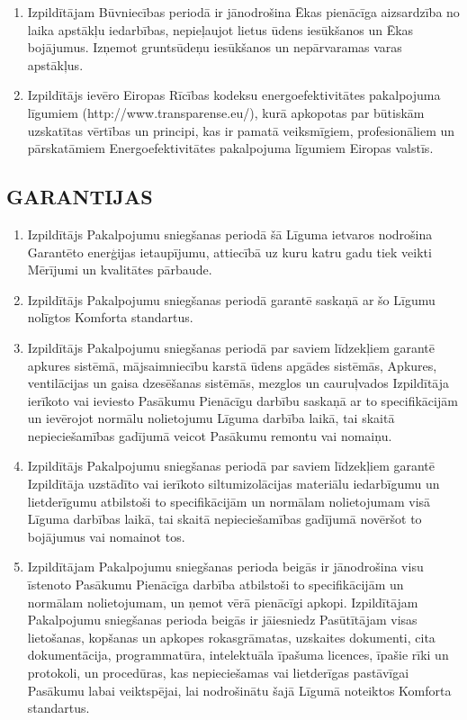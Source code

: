 \begin{multicols}{2}
\begin{enumerate}
	\item Izpildītājam Būvniecības periodā ir jānodrošina Ēkas pienācīga aizsardzība no laika apstākļu iedarbības, nepieļaujot lietus ūdens iesūkšanos un Ēkas bojājumus. Izņemot gruntsūdeņu iesūkšanos un nepārvaramas varas apstākļus.
	\item Izpildītājs ievēro Eiropas Rīcības kodeksu energoefektivitātes pakalpojuma līgumiem (http://www.transparense.eu/), kurā apkopotas par būtiskām uzskatītas vērtības un principi, kas ir pamatā veiksmīgiem, profesionāliem un pārskatāmiem Energoefektivitātes pakalpojuma līgumiem Eiropas valstīs.
\end{enumerate}

\subsection{GARANTIJAS}
\begin{enumerate}
	\item Izpildītājs Pakalpojumu sniegšanas periodā šā Līguma ietvaros nodrošina Garantēto enerģijas ietaupījumu, attiecībā uz kuru katru gadu tiek veikti Mērījumi un kvalitātes pārbaude.
	\item Izpildītājs Pakalpojumu sniegšanas periodā garantē saskaņā ar šo Līgumu nolīgtos Komforta standartus.
	\item Izpildītājs Pakalpojumu sniegšanas periodā par saviem līdzekļiem garantē apkures sistēmā, mājsaimniecību karstā ūdens apgādes sistēmās, Apkures, ventilācijas un gaisa dzesēšanas sistēmās, mezglos un cauruļvados Izpildītāja ierīkoto vai ieviesto Pasākumu Pienācīgu darbību saskaņā ar to specifikācijām un ievērojot normālu nolietojumu Līguma darbība laikā, tai skaitā nepieciešamības gadījumā veicot Pasākumu remontu vai nomaiņu.
	\item Izpildītājs Pakalpojumu sniegšanas periodā par saviem līdzekļiem garantē Izpildītāja uzstādīto vai ierīkoto siltumizolācijas materiālu iedarbīgumu un lietderīgumu atbilstoši to specifikācijām un normālam nolietojumam visā Līguma darbības laikā, tai skaitā nepieciešamības gadījumā novēršot to bojājumus vai nomainot tos.
	\item Izpildītājam Pakalpojumu sniegšanas perioda beigās ir jānodrošina visu īstenoto Pasākumu Pienācīga darbība atbilstoši to specifikācijām un normālam nolietojumam, un ņemot vērā pienācīgi apkopi. Izpildītājam Pakalpojumu sniegšanas perioda beigās ir jāiesniedz Pasūtītājam visas lietošanas, kopšanas un apkopes rokasgrāmatas, uzskaites dokumenti, cita dokumentācija, programmatūra, intelektuāla īpašuma licences, īpašie rīki un protokoli, un procedūras, kas nepieciešamas vai lietderīgas pastāvīgai Pasākumu labai veiktspējai, lai nodrošinātu šajā Līgumā noteiktos Komforta standartus.

\end{enumerate}
\end{multicols}
